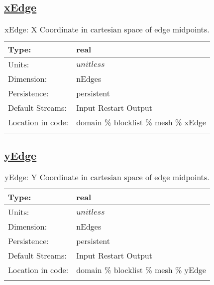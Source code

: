 \subsection[xEdge]{\hyperref[sec:var_tab_mesh]{xEdge}}
\label{subsec:var_sec_mesh_xEdge}
\begin{center}
\begin{longtable}{| p{2.0in} | p{4.0in} |}
        \hline 
        Type: & real \\
        \hline 
        Units: & $unitless$ \\
        \hline 
        Dimension: & nEdges \\
        \hline 
        Persistence: & persistent \\
        \hline 
		 Default Streams: & Input Restart Output  \\
        \hline 
		 Location in code: & domain \% blocklist \% mesh \% xEdge \\
		 \hline 
    \caption{xEdge: X Coordinate in cartesian space of edge midpoints.}
\end{longtable}
\end{center}
\subsection[yEdge]{\hyperref[sec:var_tab_mesh]{yEdge}}
\label{subsec:var_sec_mesh_yEdge}
\begin{center}
\begin{longtable}{| p{2.0in} | p{4.0in} |}
        \hline 
        Type: & real \\
        \hline 
        Units: & $unitless$ \\
        \hline 
        Dimension: & nEdges \\
        \hline 
        Persistence: & persistent \\
        \hline 
		 Default Streams: & Input Restart Output  \\
        \hline 
		 Location in code: & domain \% blocklist \% mesh \% yEdge \\
		 \hline 
    \caption{yEdge: Y Coordinate in cartesian space of edge midpoints.}
\end{longtable}
\end{center}
